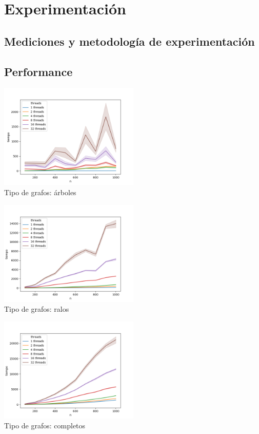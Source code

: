 \section{Experimentación}
\subsection{Mediciones y metodología de experimentación}

\subsection{Performance}

\begin{center}
  \includegraphics[width=0.5\textwidth]{imagenes/arbol.png} \\
  Tipo de grafos: árboles
\end{center}

\begin{center}
  \includegraphics[width=0.5\textwidth]{imagenes/ralo.png} \\
  Tipo de grafos: ralos
\end{center}

\begin{center}
  \includegraphics[width=0.5\textwidth]{imagenes/completo.png} \\
  Tipo de grafos: completos
\end{center}

